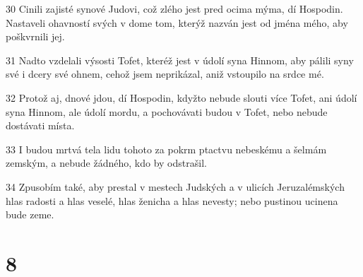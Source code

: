 \par 30 Cinili zajisté synové Judovi, což zlého jest pred ocima mýma, dí Hospodin. Nastaveli ohavností svých v dome tom, kterýž nazván jest od jména mého, aby poškvrnili jej.
\par 31 Nadto vzdelali výsosti Tofet, kteréž jest v údolí syna Hinnom, aby pálili syny své i dcery své ohnem, cehož jsem neprikázal, aniž vstoupilo na srdce mé.
\par 32 Protož aj, dnové jdou, dí Hospodin, kdyžto nebude slouti více Tofet, ani údolí syna Hinnom, ale údolí mordu, a pochovávati budou v Tofet, nebo nebude dostávati místa.
\par 33 I budou mrtvá tela lidu tohoto za pokrm ptactvu nebeskému a šelmám zemským, a nebude žádného, kdo by odstrašil.
\par 34 Zpusobím také, aby prestal v mestech Judských a v ulicích Jeruzalémských hlas radosti a hlas veselé, hlas ženicha a hlas nevesty; nebo pustinou ucinena bude zeme.

\chapter{8}

